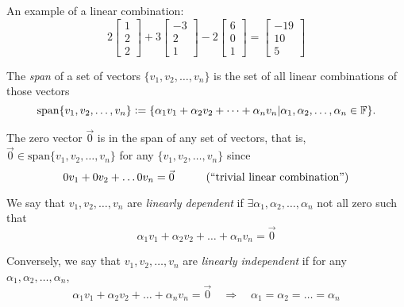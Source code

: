 \begin{example}
An example of a linear combination:
$$
2 \begin{bmatrix} 1 \\ 2 \\ 2 \end{bmatrix} + 
3 \begin{bmatrix} -3 \\ 2 \\ 1 \end{bmatrix} -
2 \begin{bmatrix} 6 \\ 0 \\ 1 \end{bmatrix} = 
\begin{bmatrix} -19 \\ 10 \\ 5 \end{bmatrix}
$$
\end{example}

\begin{definition}[Span]
\label{def:span}
The \textit{span} of a set of vectors $\{v_1, v_2, \dots, v_n\}$ is the set of all linear combinations of those vectors
$$
\text{span}\{v_1, v_2, \dots, v_n\} 
    \vcentcolon= 
\{\alpha_1v_1 + \alpha_2v_2 + \dots + \alpha_nv_n | \alpha_1, \alpha_2, \dots, \alpha_n \in \mathbb F \}.
$$
\end{definition}

\begin{remark*}
The zero vector $\vec{0}$ is in the span of any set of vectors, that is, $\vec{0} \in \text{span}\{v_1, v_2, \dots, v_n\}$ for any $\{v_1, v_2, \dots, v_n\}$ since
$$
0v_1 + 0v_2 + \dots 0v_n = \vec{0} \hspace{1cm} (``\text{trivial linear combination}")
$$
\end{remark*}

\begin{definition} 
\label{def:linear-dependence}
We say that $v_1, v_2, \dots, v_n$ are \textit{linearly dependent} if $\exists \alpha_1, \alpha_2, \dots, \alpha_n$ not all zero such that
$$
\alpha_1v_1 + \alpha_2v_2 + \dots + \alpha_nv_n = \vec{0}
$$
\end{definition}

\begin{remark*}
Conversely, we say that $v_1, v_2, \dots, v_n$ are \textit{linearly independent} if for any $\alpha_1, \alpha_2, \dots, \alpha_n$,
$$
\alpha_1v_1 + \alpha_2v_2 + \dots + \alpha_nv_n = \vec{0} \quad     \Rightarrow \quad 
\alpha_1 = \alpha_2 = \dots = \alpha_n
$$
\end{remark*}
    
